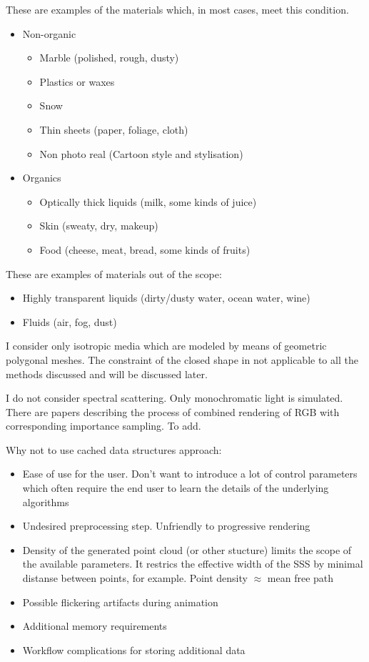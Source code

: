 These are examples of the materials which, in most cases, meet this condition.
\begin{itemize}
    \item Non-organic
    \begin{itemize}
        \item Marble (polished, rough, dusty)
        \item Plastics or waxes
        \item Snow
        \item Thin sheets (paper, foliage, cloth)
        \item Non photo real (Cartoon style and stylisation)
    \end{itemize}
    \item Organics
    \begin{itemize}
    \item Optically thick liquids (milk, some kinds of juice)
        \item Skin (sweaty, dry, makeup)
        \item Food (cheese, meat, bread, some kinds of fruits)
    \end{itemize}
\end{itemize}
These are examples of materials out of the scope:
\begin{itemize}
    \item Highly transparent liquids (dirty/dusty water, ocean water, wine)
    \item Fluids (air, fog, dust)
\end{itemize}
I consider only isotropic media which are modeled by means of geometric
polygonal meshes. The constraint of the closed shape in not applicable to all
the methods discussed and will be discussed later.

I do not consider spectral scattering. Only monochromatic light is simulated.
There are papers describing the process of combined rendering of RGB with
corresponding importance sampling. To add.

Why not to use cached data structures approach:
\begin{itemize}
    \item{Ease of use for the user. Don't want to introduce a lot of control
    parameters which often require the end user to learn the details of the
    underlying algorithms}
    \item{Undesired preprocessing step. Unfriendly to progressive rendering}
    \item{Density of the generated point cloud (or other stucture) limits the
    scope of the available parameters. It restrics the effective width of the
    SSS by minimal distanse between points, for example. Point density $\approx$
    mean free path}
    \item{Possible flickering artifacts during animation}
    \item{Additional memory requirements}
    \item{Workflow complications for storing additional data}
\end{itemize}

